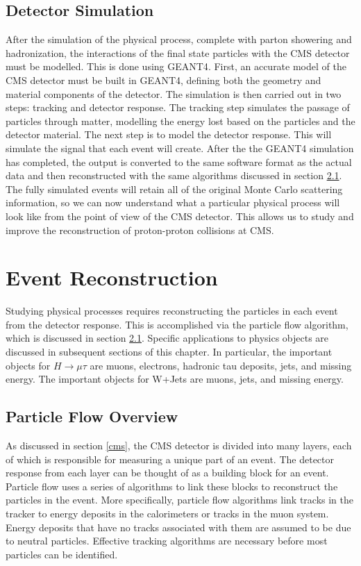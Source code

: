 \documentclass[oneside, letterpaper, oldfontcommands]{memoir}
\begin{document}
\section{Detector Simulation}\label{detectorsim}
\qquad After the simulation of the physical process, complete with parton showering and hadronization, the interactions of the final state particles with the CMS detector must be modelled. This is done using GEANT4\cite{Allison:2006ve}. First, an accurate model of the CMS detector must be built in GEANT4, defining both the geometry and material components of the detector. The simulation is then carried out in two steps: tracking and detector response. The tracking step simulates the passage of particles through matter, modelling the energy lost based on the particles and the detector material. The next step is to model the detector response. This will simulate the signal that each event will create. After the the GEANT4 simulation has completed, the output is converted to the same software format as the actual data and then reconstructed with the same algorithms discussed in section \ref{pflow}. The fully simulated events will retain all of the original Monte Carlo scattering information, so we can now understand what a particular physical process will look like from the point of view of the CMS detector. This allows us to study and improve the reconstruction of proton-proton collisions at CMS.

\chapter{Event Reconstruction}\label{eventreco}

\qquad Studying physical processes requires reconstructing the particles in each event from the detector response. This is accomplished via the particle flow algorithm, which is discussed in section \ref{pflow}. Specific applications to physics objects are discussed in subsequent sections of this chapter. In particular, the important objects for $H \rightarrow \mu\tau$ are muons, electrons, hadronic tau deposits, jets, and missing energy. The important objects for W+Jets are muons, jets, and missing energy.
\section{Particle Flow Overview}\label{pflow}
\qquad As discussed in section \ref{cms}, the CMS detector is divided into many layers, each of which is responsible for measuring a unique part of an event. The detector response from each layer can be thought of as a building block for an event. Particle flow uses a series of algorithms to link these blocks to reconstruct the particles in the event. More specifically, particle flow algorithms link tracks in the tracker to energy deposits in the calorimeters or tracks in the muon system. Energy deposits that have no tracks associated with them are assumed to be due to neutral particles. Effective tracking algorithms are necessary before most particles can be identified.
\end{document}
